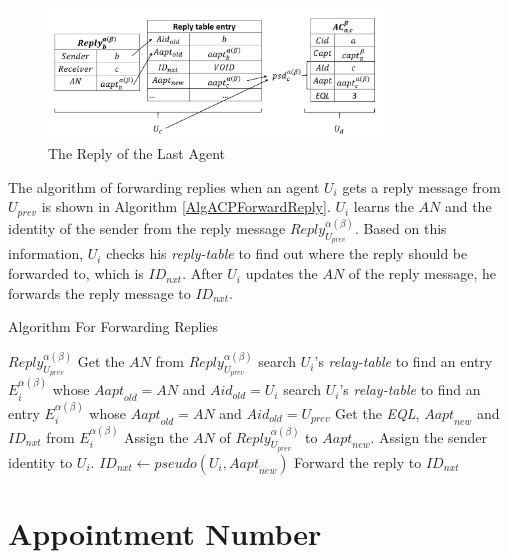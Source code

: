 \documentclass[conference]{IEEEtran}
\begin{document}
\begin{figure} [hbtp]
  \centering 
  \includegraphics[width=3.5in]{figures/FIG_4_9_The_Reply_of_the_Last_Agent.png}
  \caption{The Reply of the Last Agent} 
  \label{fig:ReplyOfLastAgent} %
\end{figure}

The algorithm of forwarding replies when an agent $U_i$ gets a reply message from $U_{prev}$ is shown in Algorithm \ref{AlgACPForwardReply}. $U_i$ learns the $AN$ and the identity of the sender from the reply message ${Reply}_{U_{prev}}^{\alpha\left(\beta\right)}$. Based on this information, $U_i$ checks his \textit{reply-table} to find out where the reply should be forwarded to, which is ${ID}_{nxt}$. After $U_i$ updates the $AN$ of the reply message, he forwards the reply message to ${ID}_{nxt}$.

\begin{algorithm} [hbtp]
\caption{Algorithm For Forwarding Replies}\label{AlgACPForwardReply}
\begin{algorithmic}[1]
 {${Reply}_{U_{prev}}^{\alpha\left(\beta\right)}$}
\State Get the $AN$ from ${Reply}_{U_{prev}}^{\alpha\left(\beta\right)}$
	\State search $U_i$’s \textit{relay-table} to find an entry $E_i^{\alpha\left(\beta\right)}$
	\State whose ${Aapt}_{old}=AN$ and ${Aid}_{old}=U_i$
\Else
	\State search $U_i$’s \textit{relay-table} to find an entry $E_i^{\alpha\left(\beta\right)}$
	\State whose ${Aapt}_{old}=AN$ and ${Aid}_{old}=U_{prev}$	
\EndIf
\State Get the \textit{EQL}, ${Aapt}_{new}$ and ${ID}_{nxt}$ from $E_i^{\alpha\left(\beta\right)}$
\State Assign the $AN$ of ${Reply}_{U_{prev}}^{\alpha\left(\beta\right)}$ to ${Aapt}_{new}$.
\State Assign the sender identity to $U_i$.
	\State ${ID}_{nxt}\gets pseudo\left(U_i,{Aapt}_{new}\right)$
\EndIf
\State Forward the reply to ${ID}_{nxt}$
\EndProcedure

\end{algorithmic}
\end{algorithm}

\section{ Appointment Number}
\end{document}
